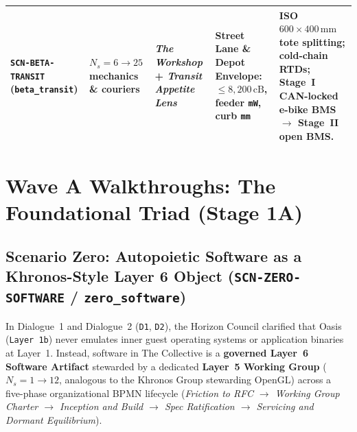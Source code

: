 \begin{table}[htbp]
\begin{tabular}{@{}p{2.3cm}p{2.0cm}p{3.0cm}p{3.0cm}p{3.4cm}@{}}
\addlinespace[3pt]
\textbf{\texttt{SCN-BETA-TRANSIT}} (\texttt{beta\_transit}) & $N_s = 6 \to 25$ mechanics \& couriers & \textit{The Workshop} + \textit{Transit Appetite Lens} & Street Lane \& Depot Envelope: $\le 8{,}200\,\mathrm{cB}$, feeder \texttt{mW}, curb \texttt{mm} & ISO $600\times 400\,\mathrm{mm}$ tote splitting; cold-chain RTDs; Stage~I CAN-locked e-bike BMS $\to$ Stage~II open BMS. \\
\bottomrule
\end{tabular}
\end{table}

\section{Wave A Walkthroughs: The Foundational Triad (Stage 1A)}
\label{sec:l2-wave-a-walkthroughs}

\subsection{Scenario Zero: Autopoietic Software as a Khronos-Style Layer 6 Object (\texttt{SCN-ZERO-SOFTWARE} / \texttt{zero\_software})}

In Dialogue~1 and Dialogue~2 (\texttt{D1}, \texttt{D2}), the Horizon Council clarified that Oasis (\texttt{Layer 1b}) never emulates inner guest operating systems or application binaries at Layer~1. Instead, software in The Collective is a \textbf{governed Layer~6 Software Artifact} stewarded by a dedicated \textbf{Layer~5 Working Group} ($N_s = 1 \to 12$, analogous to the Khronos Group stewarding OpenGL) across a five-phase organizational BPMN lifecycle (\textit{Friction to RFC $\to$ Working Group Charter $\to$ Inception and Build $\to$ Spec Ratification $\to$ Servicing and Dormant Equilibrium}).

